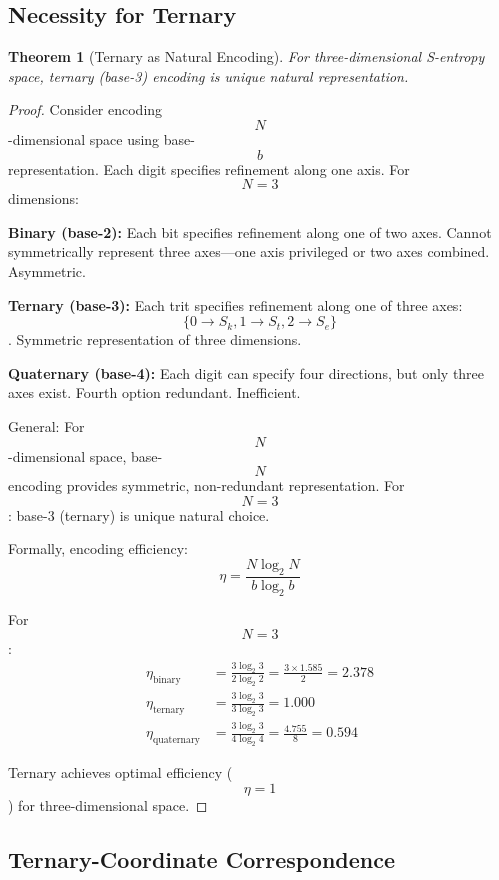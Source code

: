 \documentclass[11pt,twocolumn,a4paper]{article}
\newtheorem{theorem}{Theorem}[section]
\theoremstyle{remark}
\begin{document}
\subsection{Necessity for Ternary }

\begin{theorem}[Ternary as Natural Encoding]
\label{thm:ternary_natural}
For three-dimensional S-entropy space, ternary (base-3) encoding is unique natural representation.
\end{theorem}

\begin{proof}
Consider encoding $$N$$-dimensional space using base-$$b$$ representation. Each digit specifies refinement along one axis. For $$N = 3$$ dimensions:

\textbf{Binary (base-2):} Each bit specifies refinement along one of two axes. Cannot symmetrically represent three axes---one axis privileged or two axes combined. Asymmetric.

\textbf{Ternary (base-3):} Each trit specifies refinement along one of three axes: $$\{0 \to S_k, 1 \to S_t, 2 \to S_e\}$$. Symmetric representation of three dimensions.

\textbf{Quaternary (base-4):} Each digit can specify four directions, but only three axes exist. Fourth option redundant. Inefficient.

General: For $$N$$-dimensional space, base-$$N$$ encoding provides symmetric, non-redundant representation. For $$N = 3$$: base-3 (ternary) is unique natural choice.

Formally, encoding efficiency:
$$
\eta = \frac{N \log_2 N}{b \log_2 b}
$$

For $$N = 3$$:
\begin{align}
\eta_{\mathrm{binary}} &= \frac{3 \log_2 3}{2 \log_2 2} = \frac{3 \times 1.585}{2} = 2.378 \\
\eta_{\mathrm{ternary}} &= \frac{3 \log_2 3}{3 \log_2 3} = 1.000 \\
\eta_{\mathrm{quaternary}} &= \frac{3 \log_2 3}{4 \log_2 4} = \frac{4.755}{8} = 0.594
\end{align}

Ternary achieves optimal efficiency ($$\eta = 1$$) for three-dimensional space.
\end{proof}

\subsection{Ternary-Coordinate Correspondence}
\end{document}
